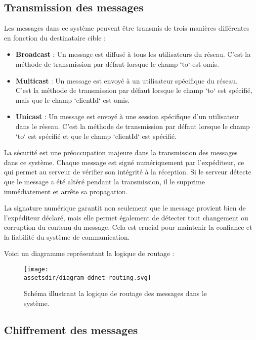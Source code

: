 \subsection{Transmission des messages}

Les messages dans ce système peuvent être transmis de trois manières différentes en fonction du destinataire cible :

\begin{itemize}
  \item \textbf{Broadcast} : Un message est diffusé à tous les utilisateurs du réseau. C'est la méthode de transmission par défaut lorsque le champ `to` est omis.
  \item \textbf{Multicast} : Un message est envoyé à un utilisateur spécifique du réseau. C'est la méthode de transmission par défaut lorsque le champ `to` est spécifié, mais que le champ `clientId` est omis.
  \item \textbf{Unicast} : Un message est envoyé à une session spécifique d'un utilisateur dans le réseau. C'est la méthode de transmission par défaut lorsque le champ `to` est spécifié et que le champ `clientId` est spécifié.
\end{itemize}

La sécurité est une préoccupation majeure dans la transmission des messages dans ce système. Chaque message est signé numériquement par l'expéditeur, ce qui permet au serveur de vérifier son intégrité à la réception. Si le serveur détecte que le message a été altéré pendant la transmission, il le supprime immédiatement et arrête sa propagation.

La signature numérique garantit non seulement que le message provient bien de l'expéditeur déclaré, mais elle permet également de détecter tout changement ou corruption du contenu du message. Cela est crucial pour maintenir la confiance et la fiabilité du système de communication.

Voici un diagramme représentant la logique de routage :

\begin{figure}[H]
  \begin{center}
    \texttt{[image: \\assetsdir/diagram-ddnet-routing.svg]}
  \end{center}
  \caption[Logique de Routage des Messages]{Schéma illustrant la logique de routage des messages dans le système.}
\end{figure}


\subsection{Chiffrement des messages}


